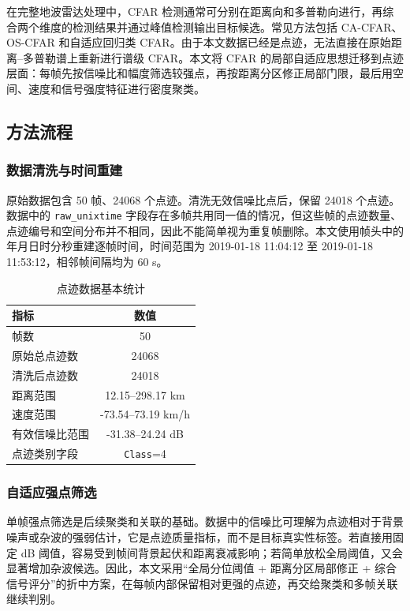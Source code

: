 \documentclass[UTF8,a4paper,12pt]{ctexart}
\numberwithin{figure}{section}
\numberwithin{table}{section}
\begin{document}
在完整地波雷达处理中，CFAR 检测通常可分别在距离向和多普勒向进行，再综合两个维度的检测结果并通过峰值检测输出目标候选。常见方法包括 CA-CFAR、OS-CFAR 和自适应回归类 CFAR。由于本文数据已经是点迹，无法直接在原始距离--多普勒谱上重新进行谱级 CFAR。本文将 CFAR 的局部自适应思想迁移到点迹层面：每帧先按信噪比和幅度筛选较强点，再按距离分区修正局部门限，最后用空间、速度和信号强度特征进行密度聚类。

\subsection{方法流程}

\subsubsection{数据清洗与时间重建}

原始数据包含 50 帧、24068 个点迹。清洗无效信噪比点后，保留 24018 个点迹。数据中的 \texttt{raw\_unixtime} 字段存在多帧共用同一值的情况，但这些帧的点迹数量、点迹编号和空间分布并不相同，因此不能简单视为重复帧删除。本文使用帧头中的年月日时分秒重建逐帧时间，时间范围为 2019-01-18 11:04:12 至 2019-01-18 11:53:12，相邻帧间隔均为 60 s。

\begin{table}[H]
  \centering
  \caption{点迹数据基本统计}
  \label{tab:data_summary}
  \begin{tabular}{lc}
    \toprule
    指标 & 数值 \\
    \midrule
    帧数 & 50 \\
    原始总点迹数 & 24068 \\
    清洗后点迹数 & 24018 \\
    距离范围 & 12.15--298.17 km \\
    速度范围 & -73.54--73.19 km/h \\
    有效信噪比范围 & -31.38--24.24 dB \\
    点迹类别字段 & \texttt{Class}=4 \\
    \bottomrule
  \end{tabular}
\end{table}

\subsubsection{自适应强点筛选}

单帧强点筛选是后续聚类和关联的基础。数据中的信噪比可理解为点迹相对于背景噪声或杂波的强弱估计，它是点迹质量指标，而不是目标真实性标签。若直接用固定 dB 阈值，容易受到帧间背景起伏和距离衰减影响；若简单放松全局阈值，又会显著增加杂波候选。因此，本文采用“全局分位阈值 + 距离分区局部修正 + 综合信号评分”的折中方案，在每帧内部保留相对更强的点迹，再交给聚类和多帧关联继续判别。
\end{document}
